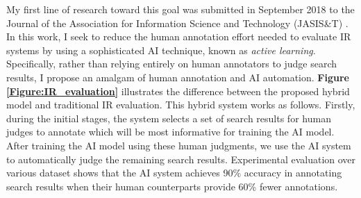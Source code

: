 \documentclass{article}
\begin{document}
My first line of research toward this goal was submitted in September 2018 to the Journal of the Association for Information Science and Technology (JASIS\&T) \cite{DBLP:journals/corr/abs-1801-05605}. In this work, I seek to reduce the human annotation effort needed to evaluate IR systems by using a sophisticated AI technique, known as {\it active learning}.  Specifically, rather than relying entirely on human annotators to judge search results, I propose an amalgam of human annotation and AI automation. {\bf Figure \ref{Figure:IR_evaluation}} illustrates the difference between the proposed hybrid model and traditional IR evaluation. This hybrid system works as follows. Firstly, during the initial stages, the system selects a set of search results for human judges to annotate which will be most informative for training the AI model. After training the AI model using these human judgments, we use the AI system to automatically judge the remaining search results. Experimental evaluation over various dataset shows that the AI system achieves 90\% accuracy in annotating search results when their human counterparts provide 60\% fewer annotations. 
\end{document}
